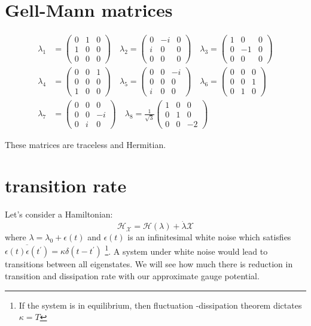 \documentclass[11pt,a4paper]{article}
\begin{document}
\section{Gell-Mann matrices}
\begin{align*}
\lambda_1 &= \begin{pmatrix} 0 & 1 & 0 \\ 1 & 0 & 0 \\ 0 & 0 & 0 \end{pmatrix}
\quad \lambda_2 = \begin{pmatrix} 0 & -i & 0 \\ i & 0 & 0 \\ 0 & 0 & 0 \end{pmatrix}
\quad \lambda_3 = \begin{pmatrix} 1 & 0 & 0 \\ 0 & -1 & 0 \\ 0 & 0 & 0 \end{pmatrix}\\
\lambda_4 &= \begin{pmatrix} 0 & 0 & 1 \\ 0 & 0 & 0 \\ 1 & 0 & 0 \end{pmatrix} \quad
\lambda_5 = \begin{pmatrix} 0 & 0 & -i \\ 0 & 0 & 0 \\ i & 0 & 0 \end{pmatrix} \quad
\lambda_6 = \begin{pmatrix} 0 & 0 & 0 \\ 0 & 0 & 1 \\ 0 & 1 & 0 \end{pmatrix} \\
\lambda_7 &= \begin{pmatrix} 0 & 0 & 0 \\ 0 & 0 & -i \\ 0 & i & 0 \end{pmatrix} \quad
\lambda_8 = \frac{1}{\sqrt{3}} \begin{pmatrix} 1 & 0 & 0 \\ 0 & 1 & 0 \\ 0 & 0 & -2 \end{pmatrix}
\end{align*}

These matrices are traceless and Hermitian.

\section{transition rate}
Let's consider a Hamiltonian:
\begin{equation}
\mathcal{H}_{\mathcal{X}} = \mathcal{H} (\lambda) + \dot{\lambda} \mathcal{X}
\end{equation}
where $\lambda= \lambda_0 + \epsilon(t)$ and  $\epsilon(t)$  is an infinitesimal white noise which satisfies $\overline{ \epsilon(t) \epsilon(t^{\prime})}= \kappa \delta(t -t^{\prime})$ \footnote{If the system is in equilibrium, then fluctuation -dissipation theorem dictates $\kappa = T$}. 
A system under white noise would lead to transitions between all eigenstates. We will see how much there is reduction in transition and dissipation rate with our approximate gauge potential.
\end{document}
